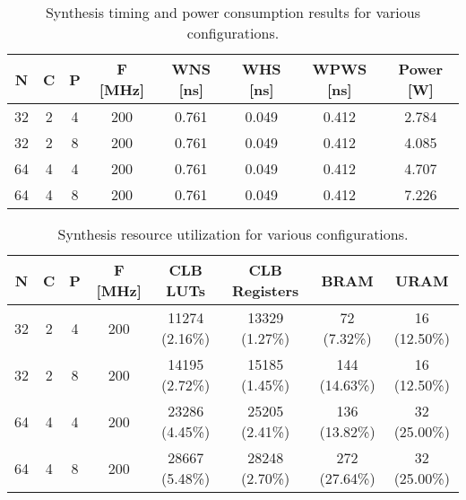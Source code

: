 
\begin{table}[H]
  \centering
  \caption{Synthesis timing and power consumption results for various configurations.}
  \label{tab:synth1}
  \begin{tabular}{ c | c | c || c || c | c | c || c }
    \textbf{N} & \textbf{C} & \textbf{P} & \textbf{F [MHz]} & \textbf{WNS [ns]} & \textbf{WHS [ns]} & \textbf{WPWS [ns]} & \textbf{Power [W]} \\ \hline \hline
    32 & 2 & 4 & 200 & 0.761 & 0.049 & 0.412 & 2.784 \\
    32 & 2 & 8 & 200 & 0.761 & 0.049 & 0.412 & 4.085 \\
    64 & 4 & 4 & 200 & 0.761 & 0.049 & 0.412 & 4.707 \\
    64 & 4 & 8 & 200 & 0.761 & 0.049 & 0.412 & 7.226 \\
  \end{tabular}
\end{table}

\begin{table}[H]
  \centering
  \caption{Synthesis resource utilization for various configurations.}
  \label{tab:synth2}
  \begin{tabular}{ c | c | c || c || c | c | c | c }

    \textbf{N} & \textbf{C} & \textbf{P} & \textbf{F [MHz]} & \textbf{CLB LUTs} & \textbf{CLB Registers} & \textbf{BRAM} & \textbf{URAM} \\ \hline \hline
    32 & 2 & 4 & 200 & 11274 (2.16\%) & 13329 (1.27\%) & 72 (7.32\%) & 16 (12.50\%) \\
    32 & 2 & 8 & 200 & 14195 (2.72\%) & 15185 (1.45\%) & 144 (14.63\%) & 16 (12.50\%) \\
    64 & 4 & 4 & 200 & 23286 (4.45\%) & 25205 (2.41\%) & 136 (13.82\%) & 32 (25.00\%) \\
    64 & 4 & 8 & 200 & 28667 (5.48\%) & 28248 (2.70\%) & 272 (27.64\%) & 32 (25.00\%) \\
  \end{tabular}
\end{table}

